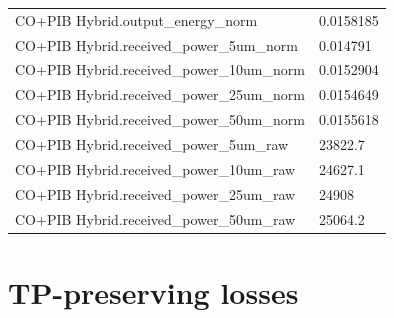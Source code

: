 \begin{longtable}{p{}p{}}
CO+PIB Hybrid.output\_energy\_norm & 0.0158185\\
CO+PIB Hybrid.received\_power\_5um\_norm & 0.014791\\
CO+PIB Hybrid.received\_power\_10um\_norm & 0.0152904\\
CO+PIB Hybrid.received\_power\_25um\_norm & 0.0154649\\
CO+PIB Hybrid.received\_power\_50um\_norm & 0.0155618\\
CO+PIB Hybrid.received\_power\_5um\_raw & 23822.7\\
CO+PIB Hybrid.received\_power\_10um\_raw & 24627.1\\
CO+PIB Hybrid.received\_power\_25um\_raw & 24908\\
CO+PIB Hybrid.received\_power\_50um\_raw & 25064.2\\
\end{longtable}

\section{TP-preserving losses}
